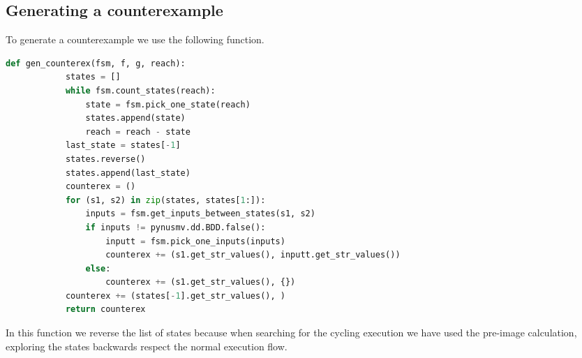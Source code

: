 \documentclass[9pt,oneside]{amsart}
\begin{document}
\begin{multicols}{2}
	\section{Generating a counterexample}\label{back}
	To generate a counterexample we use the following function.
	\begin{lstlisting}[language=Python]
		def gen_counterex(fsm, f, g, reach):
			states = []
			while fsm.count_states(reach):
				state = fsm.pick_one_state(reach)
				states.append(state)
				reach = reach - state
			last_state = states[-1]
			states.reverse()
			states.append(last_state)
			counterex = ()
			for (s1, s2) in zip(states, states[1:]):
				inputs = fsm.get_inputs_between_states(s1, s2)
				if inputs != pynusmv.dd.BDD.false():
					inputt = fsm.pick_one_inputs(inputs)
					counterex += (s1.get_str_values(), inputt.get_str_values())
				else:
					counterex += (s1.get_str_values(), {})
			counterex += (states[-1].get_str_values(), )
			return counterex
	\end{lstlisting}
	In this function we reverse the list of states because when searching for the cycling execution we have used the pre-image calculation, exploring the states backwards respect the normal execution flow.
\end{multicols}
\end{document}
